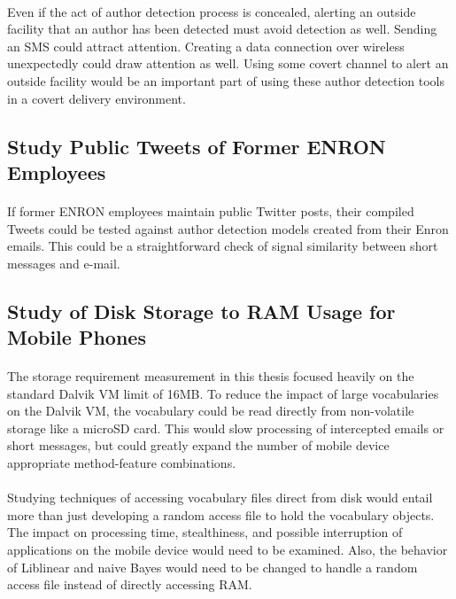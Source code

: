 \paragraph*{} Even if the act of author detection process is concealed, alerting an outside facility that an author has been detected must avoid detection as well.  Sending an SMS could attract attention.  Creating a data connection over wireless unexpectedly could draw attention as well.  Using some covert channel to alert an outside facility would be an important part of using these author detection tools in a covert delivery environment.

\subsection{Study Public Tweets of Former ENRON Employees}
\paragraph*{} If former ENRON employees maintain public Twitter posts, their compiled Tweets could be tested against author detection models created from their Enron emails.  This could be a straightforward check of signal similarity between short messages and e-mail.

\subsection{Study of Disk Storage to RAM Usage for Mobile Phones}
\paragraph*{} The storage requirement measurement in this thesis focused heavily on the standard Dalvik VM limit of 16MB.  To reduce the impact of large vocabularies on the Dalvik VM, the vocabulary could be read directly from non-volatile storage like a microSD card.  This would slow processing of intercepted emails or short messages, but could greatly expand the number of mobile device appropriate method-feature combinations.
\paragraph*{} Studying techniques of accessing vocabulary files direct from disk would entail more than just developing a random access file to hold the vocabulary objects.  The impact on processing time, stealthiness, and possible interruption of applications on the mobile device would need to be examined.  Also, the behavior of Liblinear and naive Bayes would need to be changed to handle a random access file instead of directly accessing RAM.

